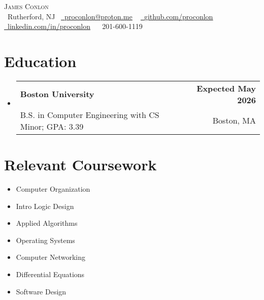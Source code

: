 \documentclass[letterpaper,11pt]{article}
\makeatletter
\newcommand{\resumeSubheading}[4]{
  \vspace{-2pt}\item
    \begin{tabular*}{1.0\textwidth}[t]{l@{\extracolsep{\fill}}r}
      \textbf{#1} & \textbf{\small #2} \\
        {\small#3} & {\small #4} \\
    \end{tabular*}\vspace{-7pt}
}
\newcommand{\resumeSubHeadingListStart}{\begin{itemize}[leftmargin=0.0in, label={}]}
\newcommand{\resumeSubHeadingListEnd}{\end{itemize}}
\makeatother
\begin{document}

\begin{center}
    {\Huge \scshape James Conlon}\\    \vspace{1pt}
    \small
    \raisebox{-0.1\height}\faLocationArrow\ Rutherford, NJ~
    \href{mailto:proconlon@proton.me}{\raisebox{-0.2\height}\faEnvelope\  \underline{proconlon@proton.me}} ~ 
    \href{https://github.com/proconlon}{\raisebox{-0.2\height}\faGithub\ \underline{github.com/proconlon}} ~
    \href{https://linkedin.com/in/proconlon/}{\raisebox{-0.2\height}\faLinkedin\ \underline{linkedin.com/in/proconlon}} ~
    \raisebox{-0.1\height}\faPhone\ 201-600-1119
    \vspace{-8pt}
\end{center}


\section{Education}
  \resumeSubHeadingListStart
    \resumeSubheading
      {Boston University}{Expected May 2026}
      {B.S. in Computer Engineering with CS Minor; GPA: 3.39}{Boston, MA}
  \resumeSubHeadingListEnd




\section{Relevant Coursework}
        \begin{multicols}{4}
            \begin{itemize}[itemsep=-5pt, parsep=3pt]
                \item\small Computer Organization
                \item Intro Logic Design
                \item Applied Algorithms
                \item Operating Systems
                \item Computer Networking
                \item Differential Equations
                \item Software Design
            \end{itemize}
        \end{multicols}
        \vspace*{2.0\multicolsep}
\end{document}
